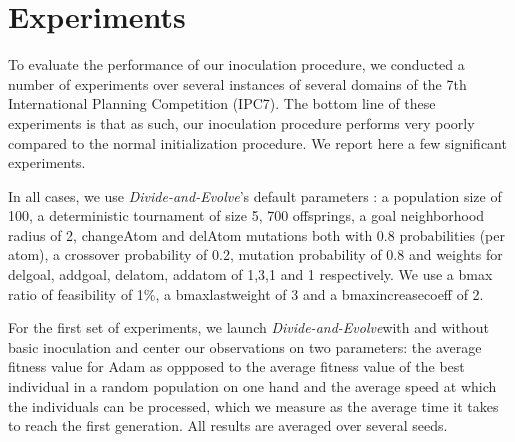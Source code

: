 \documentclass[english]{DESCARWINreport}
\newcommand{\dae}{{\em Divide-and-Evolve}}
\begin{document}
\begin{algorithm}[h!]
\caption{$estimate b_{max} insemination$}
{\small
\begin{algorithmic}[1]

\ENDFOR


\ENDIF
\ENDFOR

\ENDWHILE
{}
\ENDWHILE

\end{algorithmic}
}
\end{algorithm}


\newpage

\section{Experiments}

To evaluate the performance of our inoculation procedure, we conducted a number of experiments over several instances of several domains of the 7th International Planning Competition (IPC7). The bottom line of these experiments is that as such, our inoculation procedure performs very poorly compared to the normal initialization procedure. We report here a few significant experiments.

In all cases, we use \dae's default parameters : a population size of 100, a deterministic tournament of size 5, 700 offsprings, a goal neighborhood radius of 2, changeAtom and delAtom mutations both with 0.8 probabilities (per atom), a crossover probability of 0.2, mutation probability of 0.8 and weights for delgoal, addgoal, delatom, addatom of 1,3,1 and 1 respectively. We use a bmax ratio of feasibility of 1\%, a bmaxlastweight of 3 and a bmaxincreasecoeff of 2.

For the first set of experiments, we launch \dae with and without basic inoculation and center our observations on two parameters: the average fitness value for Adam as oppposed to the average fitness value of the best individual in a random population on one hand and the average speed at which the individuals can be processed, which we measure as the average time it takes to reach the first generation. All results are averaged over several seeds.
\end{document}
